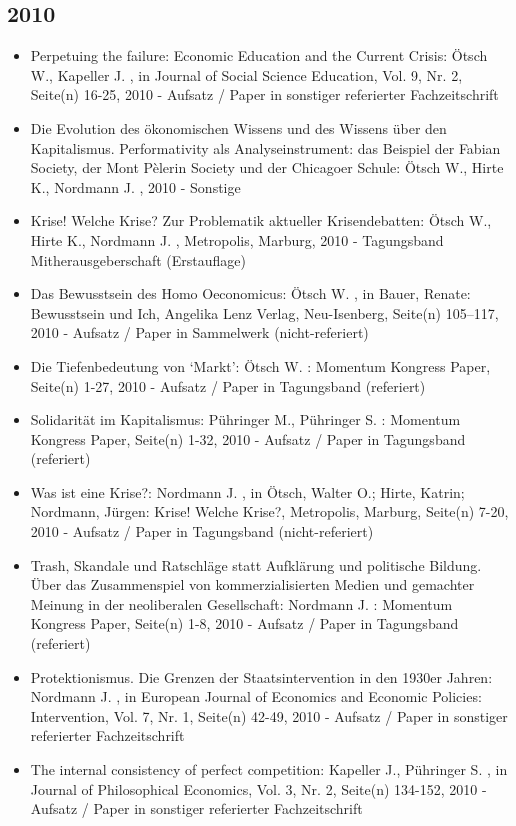  \subsection{2010} 
 \begin{itemize} 
	 \item Perpetuing the failure: Economic Education and the Current Crisis: Ötsch W., Kapeller J. , in Journal of Social Science Education, Vol. 9, Nr. 2, Seite(n) 16-25, 2010 - Aufsatz / Paper in sonstiger referierter Fachzeitschrift
	 \item Die Evolution des ökonomischen Wissens und des Wissens über den Kapitalismus. Performativity als Analyseinstrument: das Beispiel der Fabian Society, der Mont Pèlerin Society und der Chicagoer Schule: Ötsch W., Hirte K., Nordmann J. , 2010 - Sonstige
	 \item Krise! Welche Krise? Zur Problematik aktueller Krisendebatten: Ötsch W., Hirte K., Nordmann J. , Metropolis, Marburg, 2010 - Tagungsband Mitherausgeberschaft (Erstauflage)
	 \item Das Bewusstsein des Homo Oeconomicus: Ötsch W. , in Bauer, Renate: Bewusstsein und Ich, Angelika Lenz Verlag, Neu-Isenberg, Seite(n) 105–117, 2010 - Aufsatz / Paper in Sammelwerk (nicht-referiert)
	 \item Die Tiefenbedeutung von ‘Markt’: Ötsch W. : Momentum Kongress Paper, Seite(n) 1-27, 2010 - Aufsatz / Paper in Tagungsband (referiert)
	 \item Solidarität im Kapitalismus: Pühringer M., Pühringer S. : Momentum Kongress Paper, Seite(n) 1-32, 2010 - Aufsatz / Paper in Tagungsband (referiert)
	 \item Was ist eine Krise?: Nordmann J. , in Ötsch, Walter O.; Hirte, Katrin; Nordmann, Jürgen: Krise! Welche Krise?, Metropolis, Marburg, Seite(n) 7-20, 2010 - Aufsatz / Paper in Tagungsband (nicht-referiert)
	 \item Trash, Skandale und Ratschläge statt Aufklärung und politische Bildung. Über das Zusammenspiel von kommerzialisierten Medien und gemachter Meinung in der neoliberalen Gesellschaft: Nordmann J. : Momentum Kongress Paper, Seite(n) 1-8, 2010 - Aufsatz / Paper in Tagungsband (referiert)
	 \item Protektionismus. Die Grenzen der Staatsintervention in den 1930er Jahren: Nordmann J. , in European Journal of Economics and Economic Policies: Intervention, Vol. 7, Nr. 1, Seite(n) 42-49, 2010 - Aufsatz / Paper in sonstiger referierter Fachzeitschrift
	 \item The internal consistency of perfect competition: Kapeller J., Pühringer S. , in Journal of Philosophical Economics, Vol. 3, Nr. 2, Seite(n) 134-152, 2010 - Aufsatz / Paper in sonstiger referierter Fachzeitschrift

\end{itemize}
